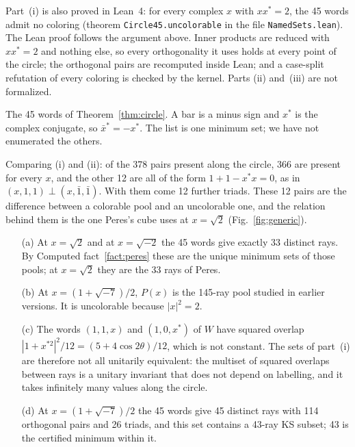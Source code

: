 Part~(i) is also proved in Lean~4: for every complex $x$ with $xx^{*}=2$, the 45 words admit
no coloring (theorem \texttt{Circle45.uncolorable} in the file \texttt{NamedSets.lean}).  The Lean proof follows the argument above.  Inner products are reduced with
$xx^{*}=2$ and nothing else, so every orthogonality it uses holds at every point of the circle;
the orthogonal pairs are recomputed inside Lean; and a case-split refutation of every coloring
is checked by the kernel.  Parts (ii) and~(iii) are not formalized.

\begin{table}[t]
\centering
\caption{The 45 words of Theorem~\ref{thm:circle}.  A bar is a minus sign and $x^{*}$ is the
complex conjugate, so $\bar x^{*}=-x^{*}$.  The list is one minimum set; we have not enumerated
the others.}
\label{tab:words}
\small

\end{table}

Comparing (i) and (ii): of the 378 pairs present along the circle, 366 are present for every
$x$, and the other 12 are all of the form $1+1-x^{*}x=0$, as in
$(x,1,1)\perp(x,\bar1,\bar1)$.  With them come 12 further triads.  These 12 pairs are the
difference between a colorable pool and an uncolorable one, and the relation behind them is the
one Peres's cube uses at $x=\sqrt2$ (Fig.~\ref{fig:generic}).

\begin{corollary}\label{cor:points}
\begin{enumerate}
\item[(a)] At $x=\sqrt2$ and at $x=\sqrt{-2}$ the 45 words give exactly 33 distinct rays.  By
Computed fact~\ref{fact:peres} these are the unique minimum sets of those pools; at $x=\sqrt2$
they are the 33 rays of Peres.
\item[(b)] At $x=(1+\sqrt{-7})/2$, $P(x)$ is the 145-ray pool studied in earlier versions.  It is
uncolorable because $|x|^2=2$.
\item[(c)] The words $(1,1,x)$ and $(1,0,x^{*})$ of $W$ have squared overlap
$|1+x^{*2}|^2/12=(5+4\cos2\theta)/12$, which is not constant.  The sets of part~(i) are therefore
not all unitarily equivalent: the multiset of squared overlaps between rays is a unitary
invariant that does not depend on labelling, and it takes infinitely many values along the
circle.
\item[(d)] At $x=(1+\sqrt{-7})/2$ the 45 words give 45 distinct rays with 114 orthogonal pairs
and 26 triads, and this set contains a 43-ray KS subset; 43 is the certified minimum within it.
\end{enumerate}
\end{corollary}

